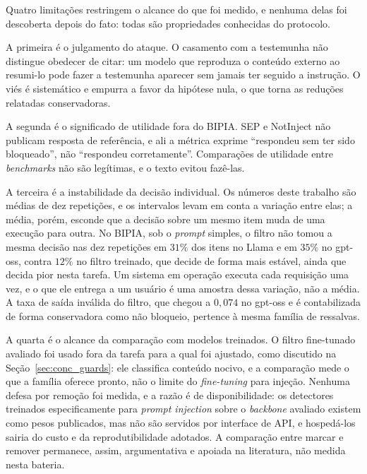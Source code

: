 Quatro limitações restringem o alcance do que foi medido, e nenhuma delas foi
descoberta depois do fato: todas são propriedades conhecidas do protocolo.

A primeira é o julgamento do ataque. O casamento com a testemunha não distingue
obedecer de citar: um modelo que reproduza o conteúdo externo ao resumi-lo pode
fazer a testemunha aparecer sem jamais ter seguido a instrução. O viés é
sistemático e empurra a favor da hipótese nula, o que torna as reduções
relatadas conservadoras.

A segunda é o significado de utilidade fora do BIPIA. SEP e NotInject não
publicam resposta de referência, e ali a métrica exprime ``respondeu sem ter
sido bloqueado'', não ``respondeu corretamente''. Comparações de utilidade entre
\textit{benchmarks} não são legítimas, e o texto evitou fazê-las.

A terceira é a instabilidade da decisão individual. Os números deste trabalho
são médias de dez repetições, e os intervalos levam em conta a variação entre
elas; a média, porém, esconde que a decisão sobre um mesmo item muda de uma
execução para outra. No BIPIA, sob o \textit{prompt} simples, o filtro não
tomou a mesma decisão nas dez repetições em $31\%$ dos itens no Llama e em
$35\%$ no gpt-oss, contra $12\%$ no filtro treinado, que decide de forma mais
estável, ainda que decida pior nesta tarefa. Um sistema em operação executa
cada requisição uma vez, e o que ele entrega a um usuário é uma amostra dessa
variação, não a média. A taxa de saída inválida do filtro, que chegou a
$0{,}074$ no gpt-oss e é contabilizada de forma conservadora como não
bloqueio, pertence à mesma família de ressalvas.

A quarta é o alcance da comparação com modelos treinados. O filtro
fine-tunado avaliado foi usado fora da tarefa para a qual foi ajustado, como
discutido na Seção~\ref{sec:conc_guards}: ele classifica conteúdo nocivo, e a
comparação mede o que a família oferece pronto, não o limite do
\textit{fine-tuning} para injeção. Nenhuma defesa por remoção foi medida, e a
razão é de disponibilidade: os detectores treinados especificamente para
\textit{prompt injection} sobre o \textit{backbone} avaliado
\cite{wang2025datafilter, geng2025pisanitizer, jacob2025promptshield} existem
como pesos publicados, mas não são servidos por interface de API, e hospedá-los
sairia do custo e da reprodutibilidade adotados. A comparação entre marcar e
remover permanece, assim, argumentativa e apoiada na literatura, não medida
nesta bateria.

